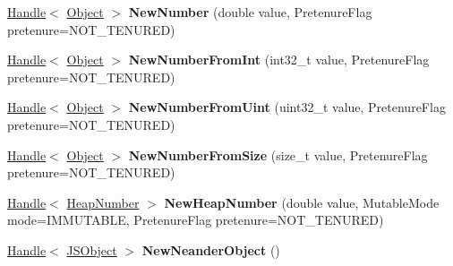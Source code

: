 \begin{DoxyCompactItemize}
\item 
\hypertarget{classv8_1_1internal_1_1_v8___f_i_n_a_l_a6cbe712443c34d86330f8075ae788a0c}{}\hyperlink{classv8_1_1internal_1_1_handle}{Handle}$<$ \hyperlink{classv8_1_1internal_1_1_object}{Object} $>$ {\bfseries New\+Number} (double value, Pretenure\+Flag pretenure=N\+O\+T\+\_\+\+T\+E\+N\+U\+R\+E\+D)\label{classv8_1_1internal_1_1_v8___f_i_n_a_l_a6cbe712443c34d86330f8075ae788a0c}

\item 
\hypertarget{classv8_1_1internal_1_1_v8___f_i_n_a_l_ab45b3cca95d02da00a50f65c84b0b38f}{}\hyperlink{classv8_1_1internal_1_1_handle}{Handle}$<$ \hyperlink{classv8_1_1internal_1_1_object}{Object} $>$ {\bfseries New\+Number\+From\+Int} (int32\+\_\+t value, Pretenure\+Flag pretenure=N\+O\+T\+\_\+\+T\+E\+N\+U\+R\+E\+D)\label{classv8_1_1internal_1_1_v8___f_i_n_a_l_ab45b3cca95d02da00a50f65c84b0b38f}

\item 
\hypertarget{classv8_1_1internal_1_1_v8___f_i_n_a_l_a03b9a93561c4a0e40db94809851188bf}{}\hyperlink{classv8_1_1internal_1_1_handle}{Handle}$<$ \hyperlink{classv8_1_1internal_1_1_object}{Object} $>$ {\bfseries New\+Number\+From\+Uint} (uint32\+\_\+t value, Pretenure\+Flag pretenure=N\+O\+T\+\_\+\+T\+E\+N\+U\+R\+E\+D)\label{classv8_1_1internal_1_1_v8___f_i_n_a_l_a03b9a93561c4a0e40db94809851188bf}

\item 
\hypertarget{classv8_1_1internal_1_1_v8___f_i_n_a_l_ade38f7666ab7a9e9e8e00139651417c8}{}\hyperlink{classv8_1_1internal_1_1_handle}{Handle}$<$ \hyperlink{classv8_1_1internal_1_1_object}{Object} $>$ {\bfseries New\+Number\+From\+Size} (size\+\_\+t value, Pretenure\+Flag pretenure=N\+O\+T\+\_\+\+T\+E\+N\+U\+R\+E\+D)\label{classv8_1_1internal_1_1_v8___f_i_n_a_l_ade38f7666ab7a9e9e8e00139651417c8}

\item 
\hypertarget{classv8_1_1internal_1_1_v8___f_i_n_a_l_abff222d247dbf79c87e1f76c5de88088}{}\hyperlink{classv8_1_1internal_1_1_handle}{Handle}$<$ \hyperlink{classv8_1_1internal_1_1_heap_number}{Heap\+Number} $>$ {\bfseries New\+Heap\+Number} (double value, Mutable\+Mode mode=I\+M\+M\+U\+T\+A\+B\+L\+E, Pretenure\+Flag pretenure=N\+O\+T\+\_\+\+T\+E\+N\+U\+R\+E\+D)\label{classv8_1_1internal_1_1_v8___f_i_n_a_l_abff222d247dbf79c87e1f76c5de88088}

\item 
\hypertarget{classv8_1_1internal_1_1_v8___f_i_n_a_l_a8416c311c1c388352c5c9b1e4e637289}{}\hyperlink{classv8_1_1internal_1_1_handle}{Handle}$<$ \hyperlink{classv8_1_1internal_1_1_j_s_object}{J\+S\+Object} $>$ {\bfseries New\+Neander\+Object} ()\label{classv8_1_1internal_1_1_v8___f_i_n_a_l_a8416c311c1c388352c5c9b1e4e637289}


\end{DoxyCompactItemize}
